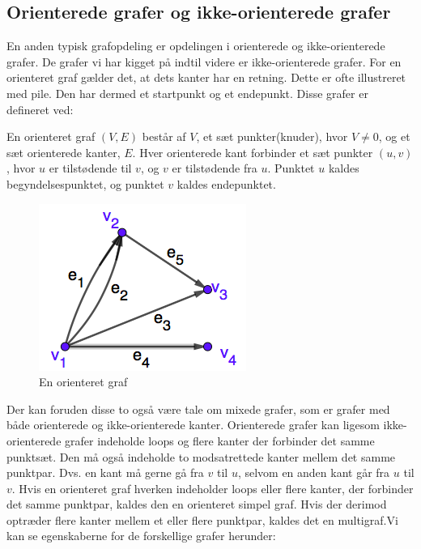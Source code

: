\subsection{Orienterede grafer og ikke-orienterede grafer}
En anden typisk grafopdeling er opdelingen i orienterede og ikke-orienterede grafer. De grafer vi har kigget på indtil videre er ikke-orienterede grafer. For en orienteret graf gælder det, at dets kanter har en retning. Dette er ofte illustreret med pile. Den har dermed et startpunkt og et endepunkt. Disse grafer er defineret ved:
\begin{definition}
En orienteret graf $(V,E)$ består af $V$, et sæt punkter(knuder), hvor $V\neq0$, og et sæt orienterede kanter, $E$. Hver orienterede kant forbinder et sæt punkter $(u,v)$, hvor $u$ er tilstødende til $v$, og $v$ er tilstødende fra $u$. Punktet $u$ kaldes begyndelsespunktet, og punktet $v$ kaldes endepunktet.
\end{definition}
\begin{figure}[H]
\centering
\includegraphics[scale=0.5]{fig/img/orienteret_graf.png}
\caption{En orienteret graf}
\label{fig:orienteret}
\end{figure}
Der kan foruden disse to også være tale om mixede grafer, som er grafer med både orienterede og ikke-orienterede kanter. Orienterede grafer kan ligesom ikke-orienterede grafer indeholde loops og flere kanter der forbinder det samme punktsæt. Den må også indeholde to modsatrettede kanter mellem det samme punktpar. Dvs. en kant må gerne gå fra $v$ til $u$, selvom en anden kant går fra $u$ til $v$. Hvis en orienteret graf hverken indeholder loops eller flere kanter, der forbinder det samme punktpar, kaldes den en orienteret simpel graf. Hvis der derimod optræder flere kanter mellem et eller flere punktpar, kaldes det en multigraf.Vi kan se egenskaberne for de forskellige grafer herunder:

